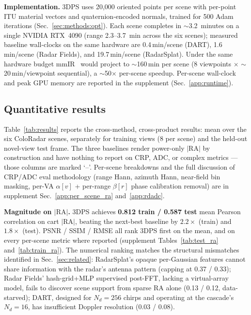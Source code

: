 \textbf{Implementation.} 3DPS uses 20{,}000 oriented points per scene with per-point ITU material vectors and quaternion-encoded normals, trained for 500 Adam iterations (Sec.~\ref{sec:methods:opt}). Each scene completes in ${\sim}$3.2~minutes on a single NVIDIA RTX~4090 (range 2.3--3.7~min across the six scenes); measured baseline wall-clocks on the same hardware are 0.4\,min/scene (DART), 1.6\,min/scene (Radar Fields), and 19.7\,min/scene (RadarSplat). Under the same hardware budget mmIR~\cite{mmIR2026} would project to ${\sim}$160\,min per scene (8 viewpoints $\times$ ${\sim}$20\,min/viewpoint sequential), a ${\sim}$50$\times$ per-scene speedup. Per-scene wall-clock and peak GPU memory are reported in the supplement (Sec.~\ref{app:runtime}).

\subsection{Quantitative results}
\label{sec:experiments:results}

Table~\ref{tab:results} reports the cross-method, cross-product results: mean over the six ColoRadar scenes, separately for training views (8 per scene) and the held-out novel-view test frame. The three baselines render power-only $|\mathrm{RA}|$ by construction and have nothing to report on CRP, ADC, or complex metrics --- those columns are marked `--'. Per-scene breakdowns and the full discussion of CRP/ADC eval methodology (range Hann, azimuth Hann, near-field bin masking, per-VA $\alpha[v]$ + per-range $\beta[r]$ phase calibration removal) are in supplement Sec.~\ref{app:per_scene_ra} and~\ref{app:rdadc}.



\textbf{Magnitude on $|\mathrm{RA}|$.} 3DPS achieves \textbf{0.812 train / 0.587 test} mean Pearson correlation on cart $|\mathrm{RA}|$, beating the next-best baseline by $2.2\!\times$ (train) and $1.8\!\times$ (test). PSNR / SSIM / RMSE all rank 3DPS first on the mean, and on every per-scene metric where reported (supplement Tables~\ref{tab:test_ra} and~\ref{tab:train_ra}). The numerical ranking matches the structural mismatches identified in Sec.~\ref{sec:related}: RadarSplat's opaque per-Gaussian features cannot share information with the radar's antenna pattern (capping at 0.37 / 0.33); Radar Fields' hash-grid+MLP supervised post-FFT, lacking a virtual-array model, fails to discover scene support from sparse RA alone (0.13 / 0.12, data-starved); DART, designed for $N_d{=}256$ chirps and operating at the cascade's $N_d{=}16$, has insufficient Doppler resolution (0.03 / 0.08).

